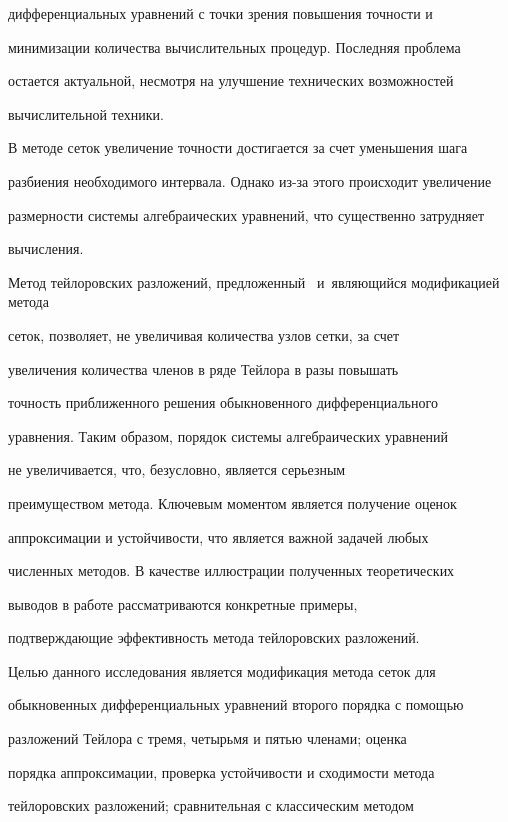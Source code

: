 дифференциальных уравнений с точки зрения повышения точности и

минимизации количества вычислительных процедур. Последняя проблема

остается актуальной, несмотря на улучшение технических возможностей

вычислительной техники.



В методе сеток увеличение точности достигается за счет уменьшения шага

разбиения необходимого интервала. Однако из-за этого происходит увеличение

размерности системы алгебраических уравнений, что существенно затрудняет

вычисления.



Метод тейлоровских разложений, предложенный~\cite{pavlova:bib1} и~являющийся модификацией метода

сеток, позволяет, не увеличивая количества узлов сетки, за счет

увеличения количества членов в ряде Тейлора в разы повышать

точность приближенного решения обыкновенного дифференциального

уравнения. Таким образом, порядок системы алгебраических уравнений

не увеличивается, что, безусловно, является серьезным

преимуществом метода. Ключевым моментом является получение оценок

аппроксимации и устойчивости, что является важной задачей любых

численных методов. В качестве иллюстрации полученных теоретических

выводов в работе рассматриваются конкретные примеры,

подтверждающие эффективность метода тейлоровских \mbox{разложений.}



Целью данного исследования является модификация метода сеток для

обыкновенных дифференциальных уравнений второго порядка с помощью

разложений Тейлора с тремя, четырьмя и пятью членами; оценка

порядка аппроксимации, проверка устойчивости и сходимости метода

тейлоровских разложений; сравнительная с классическим методом

